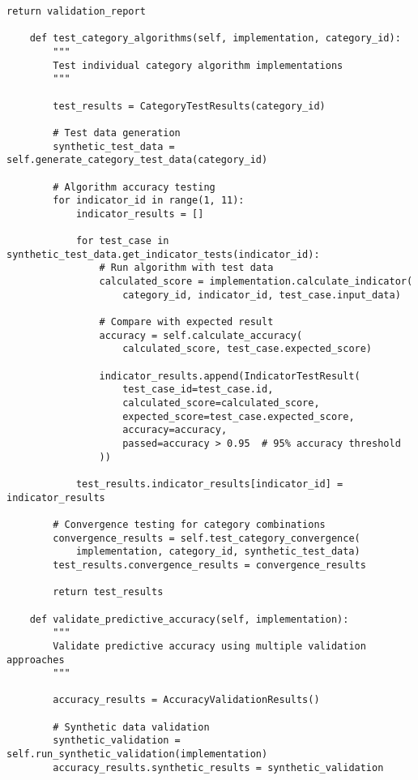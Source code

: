 \documentclass[10pt,twocolumn]{IEEEtran}
\begin{document}
\begin{lstlisting}[caption={CPF Testing and Validation Framework}]
        return validation_report
    
    def test_category_algorithms(self, implementation, category_id):
        """
        Test individual category algorithm implementations
        """
        
        test_results = CategoryTestResults(category_id)
        
        # Test data generation
        synthetic_test_data = self.generate_category_test_data(category_id)
        
        # Algorithm accuracy testing
        for indicator_id in range(1, 11):
            indicator_results = []
            
            for test_case in synthetic_test_data.get_indicator_tests(indicator_id):
                # Run algorithm with test data
                calculated_score = implementation.calculate_indicator(
                    category_id, indicator_id, test_case.input_data)
                
                # Compare with expected result
                accuracy = self.calculate_accuracy(
                    calculated_score, test_case.expected_score)
                
                indicator_results.append(IndicatorTestResult(
                    test_case_id=test_case.id,
                    calculated_score=calculated_score,
                    expected_score=test_case.expected_score,
                    accuracy=accuracy,
                    passed=accuracy > 0.95  # 95% accuracy threshold
                ))
            
            test_results.indicator_results[indicator_id] = indicator_results
        
        # Convergence testing for category combinations
        convergence_results = self.test_category_convergence(
            implementation, category_id, synthetic_test_data)
        test_results.convergence_results = convergence_results
        
        return test_results
    
    def validate_predictive_accuracy(self, implementation):
        """
        Validate predictive accuracy using multiple validation approaches
        """
        
        accuracy_results = AccuracyValidationResults()
        
        # Synthetic data validation
        synthetic_validation = self.run_synthetic_validation(implementation)
        accuracy_results.synthetic_results = synthetic_validation
        

\end{lstlisting}
\end{document}
